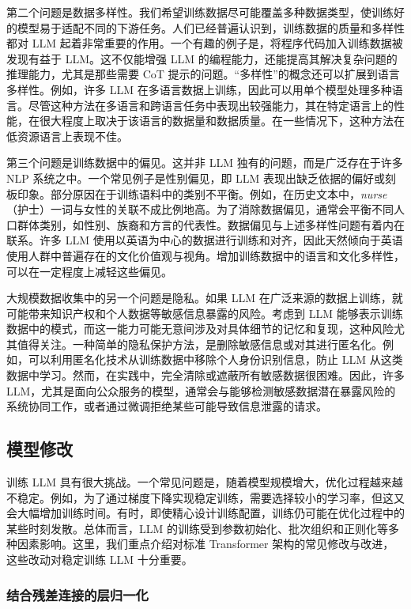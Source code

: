 第二个问题是数据多样性。我们希望训练数据尽可能覆盖多种数据类型，使训练好的模型易于适配不同的下游任务。人们已经普遍认识到，训练数据的质量和多样性都对 LLM 起着非常重要的作用。一个有趣的例子是，将程序代码加入训练数据被发现有益于 LLM。这不仅能增强 LLM 的编程能力，还能提高其解决复杂问题的推理能力，尤其是那些需要 CoT 提示的问题。“多样性”的概念还可以扩展到语言多样性。例如，许多 LLM 在多语言数据上训练，因此可以用单个模型处理多种语言。尽管这种方法在多语言和跨语言任务中表现出较强能力，其在特定语言上的性能，在很大程度上取决于该语言的数据量和数据质量。在一些情况下，这种方法在低资源语言上表现不佳。

第三个问题是训练数据中的偏见。这并非 LLM 独有的问题，而是广泛存在于许多 NLP 系统之中。一个常见例子是性别偏见，即 LLM 表现出缺乏依据的偏好或刻板印象。部分原因在于训练语料中的类别不平衡。例如，在历史文本中，\textit{nurse}（护士）一词与女性的关联不成比例地高。为了消除数据偏见，通常会平衡不同人口群体类别，如性别、族裔和方言的代表性。数据偏见与上述多样性问题有着内在联系。许多 LLM 使用以英语为中心的数据进行训练和对齐，因此天然倾向于英语使用人群中普遍存在的文化价值观与视角。增加训练数据中的语言和文化多样性，可以在一定程度上减轻这些偏见。

大规模数据收集中的另一个问题是隐私。如果 LLM 在广泛来源的数据上训练，就可能带来知识产权和个人数据等敏感信息暴露的风险。考虑到 LLM 能够表示训练数据中的模式，而这一能力可能无意间涉及对具体细节的记忆和复现，这种风险尤其值得关注。一种简单的隐私保护方法，是删除敏感信息或对其进行匿名化。例如，可以利用匿名化技术从训练数据中移除个人身份识别信息，防止 LLM 从这类数据中学习。然而，在实践中，完全清除或遮蔽所有敏感数据很困难。因此，许多 LLM，尤其是面向公众服务的模型，通常会与能够检测敏感数据潜在暴露风险的系统协同工作，或者通过微调拒绝某些可能导致信息泄露的请求。

\subsection{模型修改}

\noindent 训练 LLM 具有很大挑战。一个常见问题是，随着模型规模增大，优化过程越来越不稳定。例如，为了通过梯度下降实现稳定训练，需要选择较小的学习率，但这又会大幅增加训练时间。有时，即使精心设计训练配置，训练仍可能在优化过程中的某些时刻发散。总体而言，LLM 的训练受到参数初始化、批次组织和正则化等多种因素影响。这里，我们重点介绍对标准 Transformer 架构的常见修改与改进，这些改动对稳定训练 LLM 十分重要。

\subsubsection{结合残差连接的层归一化}

